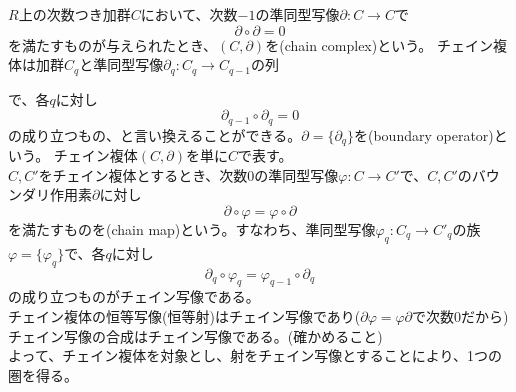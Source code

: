 \documentclass[dvipdfmx,a4paper,11pt]{jsarticle}
\begin{document}
\begin{tcolorbox}[title = 例3]
  $R$上の次数つき加群$C$において、次数$-1$の準同型写像$\partial : C\to C$で
  \begin{equation*}
    \partial \circ \partial = 0
  \end{equation*}
  を満たすものが与えられたとき、$(C,\partial)$を(chain complex)という。
  チェイン複体は加群$C_{q}$と準同型写像$\partial_{q}:C_{q}\to C_{q-1}$の列
  \begin{center}
  \end{center}
  で、各$q$に対し
  \begin{equation*}
    \partial_{q-1} \circ \partial_{q} = 0
  \end{equation*}
  の成り立つもの、と言い換えることができる。$\partial = \{\partial_{q}\}$を(boundary operator)という。
  チェイン複体$(C,\partial)$を単に$C$で表す。\\
  $C,C'$をチェイン複体とするとき、次数$0$の準同型写像$\varphi : C\to C'$で、$C,C'$のバウンダリ作用素$\partial$に対し
  \begin{equation*}
    \partial \circ \varphi = \varphi \circ \partial
  \end{equation*}
  を満たすものを(chain map)という。すなわち、準同型写像$\varphi_{q} : C_{q} \to C'_{q}$の族
  $\varphi = \{\varphi_{q}\}$で、各$q$に対し
  \begin{equation*}
    \partial_{q} \circ \varphi_{q} = \varphi_{q-1} \circ \partial_{q}
  \end{equation*}
  の成り立つものがチェイン写像である。\\
  チェイン複体の恒等写像(恒等射)はチェイン写像であり($\partial\varphi = \varphi\partial$で次数$0$だから)\\
  チェイン写像の合成はチェイン写像である。(確かめること)\\
  よって、チェイン複体を対象とし、射をチェイン写像とすることにより、1つの圏を得る。
\end{tcolorbox}
\end{document}

